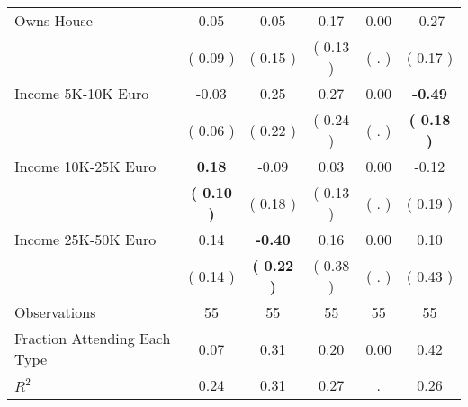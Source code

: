 \begin{table}[H]
{\begin{tabular}{lccccc}
\quad Owns House &      0.05 &      0.05 &      0.17 &      0.00 &     -0.27 \\
\quad  & (     0.09 ) & (     0.15 )  & (     0.13 )  & (        . ) & (     0.17 ) \\
\quad Income 5K-10K Euro &     -0.03 &      0.25 &      0.27 &      0.00 & \textbf{    -0.49} \\
\quad  & (     0.06 ) & (     0.22 )  & (     0.24 )  & (        . ) & \textbf{(     0.18 )} \\
\quad Income 10K-25K Euro & \textbf{     0.18} &     -0.09 &      0.03 &      0.00 &     -0.12 \\
\quad  & \textbf{(     0.10 )} & (     0.18 )  & (     0.13 )  & (        . ) & (     0.19 ) \\
\quad Income 25K-50K Euro &      0.14 & \textbf{    -0.40} &      0.16 &      0.00 &      0.10 \\
\quad  & (     0.14 ) & \textbf{(     0.22 )}  & (     0.38 )  & (        . ) & (     0.43 ) \\
\midrule
Observations & 55 & 55 & 55 & 55 & 55 \\
Fraction Attending Each Type &      0.07 &      0.31 &      0.20 &      0.00 &      0.42 \\
\midrule
$ R^2$ &      0.24 &      0.31 &      0.27 &         . &      0.26 \\
\bottomrule
\end{tabular}}
\end{table}
